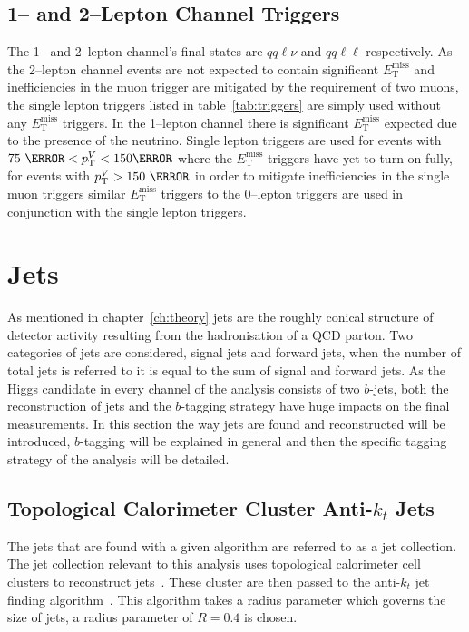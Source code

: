 \subsection{1-- and 2--Lepton Channel Triggers}
The 1-- and 2--lepton channel's final states are $qq\ell\nu$ and $qq\ell\ell$
respectively. As the 2--lepton channel events are not expected to contain
significant $E_{\mathrm{T}}^{\text{miss}}$ and inefficiencies in the muon trigger are
mitigated by the requirement of two muons, the single lepton triggers listed in
table~\ref{tab:triggers} are simply used without any $E_{\mathrm{T}}^{\text{miss}}$
triggers. In the 1--lepton channel there is significant $E_{\mathrm{T}}^{\text{miss}}$
expected due to the presence of the neutrino. Single lepton triggers are used
for events with $75~\GeV < p_{\mathrm{T}}^{V} < 150 \GeV$ where the $E_{\mathrm{T}}^{\text{miss}}$
triggers have yet to turn on fully, for events with $p_{\mathrm{T}}^{V} > 150~\GeV$ in
order to mitigate inefficiencies in the single muon triggers similar
$E_{\mathrm{T}}^{\text{miss}}$ triggers to the 0--lepton triggers are used in conjunction
with the single lepton triggers.

\section{Jets}
\label{sec:jets}

As mentioned in chapter~\ref{ch:theory} jets are the roughly conical structure
of detector activity resulting from the hadronisation of a QCD parton. Two
categories of jets are considered, signal jets and forward jets, when the number
of total jets is referred to it is equal to the sum of signal and forward jets.
As the Higgs candidate in every channel of the analysis consists of two
$b$-jets, both the reconstruction of jets and the $b$-tagging strategy have huge
impacts on the final measurements. In this section the way jets are found and
reconstructed will be introduced, $b$-tagging will be explained in general and
then the specific tagging strategy of the analysis will be detailed.

\subsection{Topological Calorimeter Cluster Anti-$k_t$ Jets}
The jets that are found with a given algorithm are referred to as a jet
collection. The jet collection relevant to this analysis uses topological
calorimeter cell clusters to reconstruct jets~\cite{CALO2008}. These cluster are
then passed to the anti-$k_t$ jet finding algorithm~\cite{anti-kt}. This
algorithm takes a radius parameter which governs the size of jets, a radius
parameter of $R=0.4$ is chosen.

